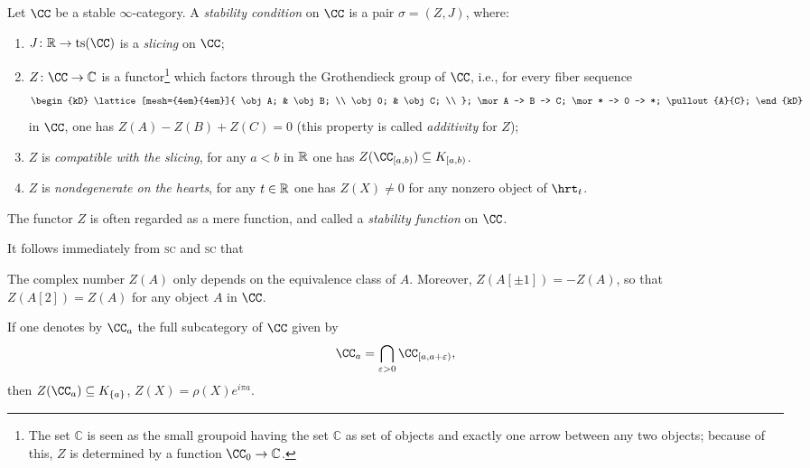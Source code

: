  \begin{definition}\label{la_zeta}
 Let $\CC$ be a stable $\infty$\hyp{}category. A \emph{stability condition} on $\CC$ is a pair $\sigma=(Z,J)$, where:
 \begin{enumerate}[label=\textsc{sc}\oldstylenums{\arabic*})]
 \item $J\colon \R\to \mathrm{ts}(\CC)$ is a \emph{slicing} on $\CC$;
 \item $Z\colon \CC\to \mathbb{C}$ is a functor\footnote{The set $\mathbb{C}$ is seen as the small groupoid having the set $\mathbb{C}$ as set of objects and exactly one arrow between any two objects; because of this, $Z$ is determined by a function $\CC_0\to \mathbb{C}$.}  which factors through the Grothendieck group of $\CC$, i.e., for every fiber sequence 
\[
\begin{kD}
\lattice[mesh={4em}{4em}]{
  \obj A; & \obj B; \\
  \obj 0; & \obj C; \\
};
\mor A -> B -> C;
\mor * -> 0 -> *;
\pullout{A}{C};
\end{kD}
 \]
in $\CC$, one has $Z(A)-Z(B)+Z(C)=0$ (this property is called \emph{additivity} for $Z$);
\item $Z$ is \emph{compatible with the slicing}, \ie for any $a<b$ in $\mathbb{R}$ one has $Z(\cab)\subseteq K_{[a,b)}$. 
\item $Z$ is \emph{nondegenerate on the hearts}, \ie for any $t\in \mathbb{R}$ one has $Z(X)\neq 0$ for any nonzero object of $\hrt_t$.
 \end{enumerate}
The functor $Z$ is often regarded as a mere function, and called a \emph{stability function} on $\CC$.
 \end{definition}
 It follows immediately from \textsc{sc} and \textsc{sc} that
 \begin{remark}
 The complex number $Z(A)$ only depends on the equivalence class of $A$. Moreover, $Z(A[\pm 1])=-Z(A)$, so that $Z(A[2])=Z(A)$ for any object $A$ in $\CC$.
 \end{remark}
 \begin{remark}
 If one denotes by $\CC_a$ the full subcategory of $\CC$ given by 
 \[
 \CC_a=\bigcap_{\eps>0}\CC_{[a,a+\eps)},
 \]
 then $Z(\CC_a)\subseteq K_{\{a\}}$, \ie $Z(X) = \rho(X) e^{i\pi a}$.
 \end{remark}

